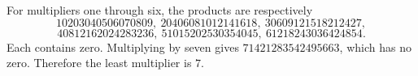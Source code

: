 For multipliers one through six, the products are respectively
\[10203040506070809,\ 20406081012141618,\ 30609121518212427,\]
\[40812162024283236,\ 51015202530354045,\ 61218243036424854.\]
Each contains zero. Multiplying by seven gives $71421283542495663$, which has no zero. Therefore the least multiplier is $\boxed7$.
